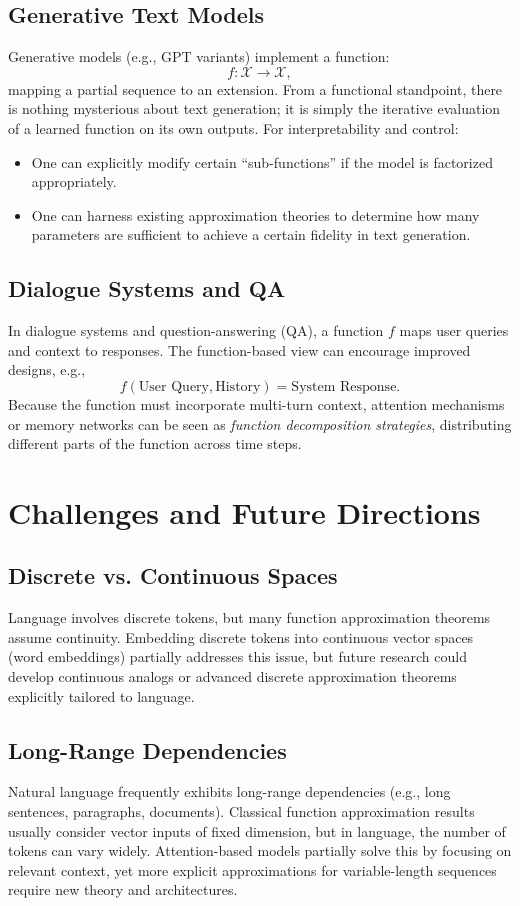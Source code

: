 \documentclass[11pt]{article}
\begin{document}
\subsection{Generative Text Models}
Generative models (e.g., GPT variants) implement a function:
\[
f: \mathcal{X} \rightarrow \mathcal{X},
\]
mapping a partial sequence to an extension. From a functional standpoint, there is nothing mysterious about text generation; it is simply the iterative evaluation of a learned function on its own outputs. For interpretability and control:
\begin{itemize}
    \item One can explicitly modify certain ``sub-functions'' if the model is factorized appropriately.
    \item One can harness existing approximation theories to determine how many parameters are sufficient to achieve a certain fidelity in text generation.
\end{itemize}

\subsection{Dialogue Systems and QA}
In dialogue systems and question-answering (QA), a function $f$ maps user queries and context to responses. The function-based view can encourage improved designs, e.g.,
\[
f(\text{User Query}, \text{History}) = \text{System Response}.
\]
Because the function must incorporate multi-turn context, attention mechanisms or memory networks can be seen as \emph{function decomposition strategies}, distributing different parts of the function across time steps.

\section{Challenges and Future Directions}
\subsection{Discrete vs. Continuous Spaces}
Language involves discrete tokens, but many function approximation theorems assume continuity. Embedding discrete tokens into continuous vector spaces (word embeddings) partially addresses this issue, but future research could develop continuous analogs or advanced discrete approximation theorems explicitly tailored to language.

\subsection{Long-Range Dependencies}
Natural language frequently exhibits long-range dependencies (e.g., long sentences, paragraphs, documents). Classical function approximation results usually consider vector inputs of fixed dimension, but in language, the number of tokens can vary widely. Attention-based models partially solve this by focusing on relevant context, yet more explicit approximations for variable-length sequences require new theory and architectures.
\end{document}
